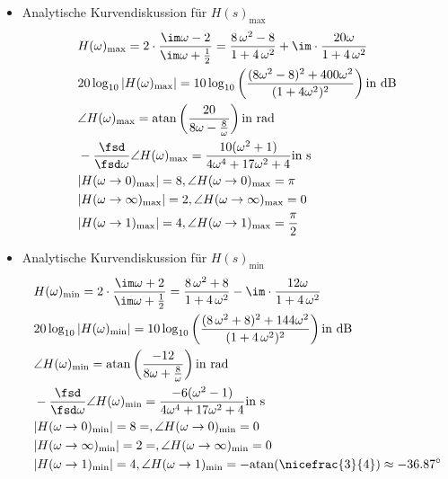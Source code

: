 \begin{itemize}
\item Analytische Kurvendiskussion für $H(s)_\mathrm{max}$
\begin{align}
&H(\omega)_\mathrm{max} = 2\cdot\frac{\im\omega-2}{\im\omega+\frac{1}{2}}=
\frac{8\,\omega^2 - 8}{1+4\,\omega^2}+
\im\cdot \frac{20\omega}{1+4\,\omega^2}\\
&20 \log_{10}|H(\omega)_\mathrm{max}| =
10 \log_{10} \left(\frac{(8 \omega^2 -8)^2 + 400 \omega^2}{(1+4\omega^2)^2}\right)\text{in dB}\\
&\angle H(\omega)_\mathrm{max} =
\mathrm{atan}\left(\frac{20}{8\omega-\frac{8}{\omega}}\right)\text{in rad}\\
&-\frac{\fsd}{\fsd \omega} \angle H(\omega)_\mathrm{max}=
\frac{10(\omega^2+1)}{4\omega^4+17\omega^2+4}\text{in s}\\
&|H(\omega\to 0)_\mathrm{max}| = 8, \angle H(\omega\to 0)_\mathrm{max} = \pi\\
&|H(\omega\to\infty)_\mathrm{max}| = 2, \angle H(\omega\to\infty)_\mathrm{max} = 0\\
&|H(\omega\to 1)_\mathrm{max}| = 4, \angle H(\omega\to 1)_\mathrm{max} = \frac{\pi}{2}
\end{align}

\item Analytische Kurvendiskussion für $H(s)_\mathrm{min}$
\begin{align}
&H(\omega)_\mathrm{min} = 2\cdot\frac{\im\omega+2}{\im\omega+\frac{1}{2}}=
\frac{8\,\omega^2 + 8}{1+4\,\omega^2}-
\im\cdot \frac{12\omega}{1+4\,\omega^2}
\\
&20 \log_{10}|H(\omega)_\mathrm{min}| =
10 \log_{10} \left(\frac{(8\,\omega^2 + 8)^2 + 144\omega^2}{(1+4\,\omega^2)^2}\right)\text{in dB}\\
&\angle H(\omega)_\mathrm{min} =
\mathrm{atan}\left(\frac{-12}{8\omega+\frac{8}{\omega}}\right)\text{in rad}\\
&-\frac{\fsd}{\fsd \omega} \angle H(\omega)_\mathrm{min}=
\frac{-6(\omega^2-1)}{4\omega^4+17\omega^2+4}\text{in s}\\
&|H(\omega\to 0)_\mathrm{min}| = 8 = , \angle H(\omega\to 0)_\mathrm{min} = 0\\
&|H(\omega\to\infty)_\mathrm{min}| = 2 = , \angle H(\omega\to\infty)_\mathrm{min} = 0\\
&|H(\omega\to 1)_\mathrm{min}| = 4, \angle H(\omega\to 1)_\mathrm{min} = -\mathrm{atan}(\nicefrac{3}{4}) \approx -36.87^\circ
\end{align}


\end{itemize}
